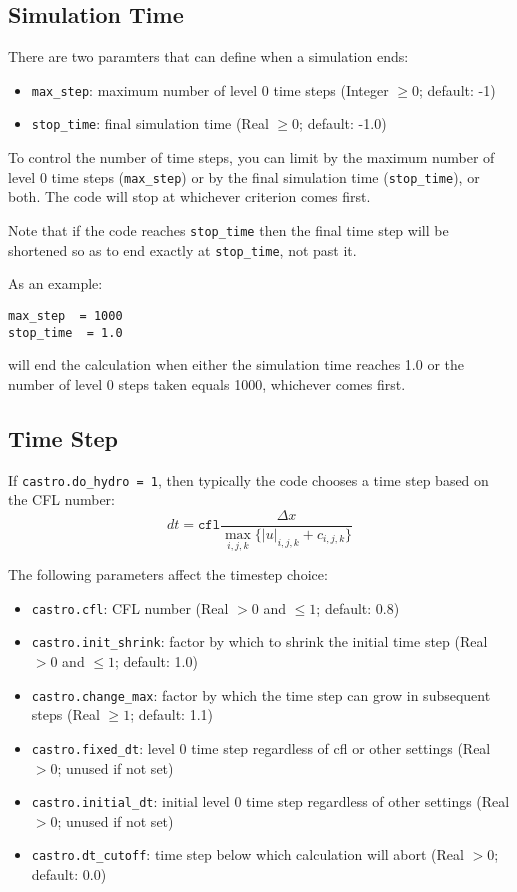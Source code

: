 \subsection{Simulation Time}

There are two paramters that can define when a simulation ends:
\begin{itemize}
\item {\tt max\_step}: maximum number of level 0 time steps (Integer $\geq 0$; default: -1)
\item {\tt stop\_time}: final simulation time (Real $\geq 0$;  default: -1.0)
\end{itemize}
To control the number of time steps, you can limit by the maximum
number of level 0 time steps ({\tt max\_step}) or by the final
simulation time ({\tt stop\_time}), or both. The code will stop at
whichever criterion comes first.

Note that if the code reaches {\tt stop\_time} then the final time
step will be shortened so as to end exactly at {\tt stop\_time}, not
past it.

As an example: 
\begin{lstlisting}
max_step  = 1000
stop_time  = 1.0
\end{lstlisting}
will end the calculation when either the simulation time reaches 1.0 or 
the number of level 0 steps taken equals 1000, whichever comes first.


\subsection{Time Step}
If {\tt castro.do\_hydro = 1}, then typically 
the code chooses a time step based on the CFL number:
\begin{equation}
dt = \mathtt{cfl} \frac{\Delta x}{\max_{i,j,k}\{|u|_{i,j,k}+c_{i,j,k}\}}
\label{eq:cfl}
\end{equation}

The following parameters affect the timestep choice:
\begin{itemize}
\item {\tt castro.cfl}: CFL number (Real $> 0$ and $\leq 1$; default: 0.8)

\item {\tt castro.init\_shrink}: factor by which to shrink the initial
   time step (Real $> 0$ and $\leq 1$; default: 1.0)

\item {\tt castro.change\_max}: factor by which the time step can grow in
   subsequent steps (Real $\geq 1$; default: 1.1)

\item {\tt castro.fixed\_dt}: level 0 time step regardless of cfl or other settings
   (Real $> 0$; unused if not set)

\item {\tt castro.initial\_dt}: initial level 0 time
   step regardless of other settings (Real $> 0$;  unused if not set)

\item {\tt castro.dt\_cutoff}: time step below which calculation will abort
   (Real $> 0$; default: 0.0)
\end{itemize}

